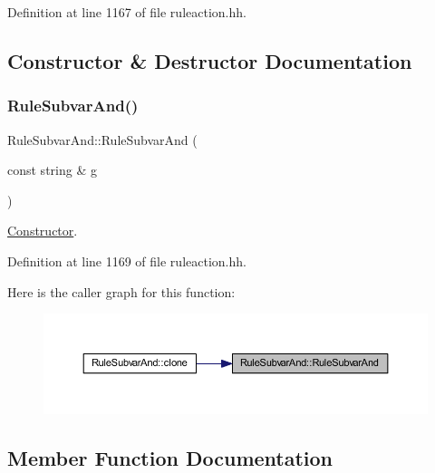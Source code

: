 Definition at line 1167 of file ruleaction.\+hh.



\subsection{Constructor \& Destructor Documentation}
\mbox{\label{class_rule_subvar_and_a3cf5454eb07e66a704d9939883213dc8}} 
\subsubsection{\texorpdfstring{RuleSubvarAnd()}{RuleSubvarAnd()}}
{\footnotesize\ttfamily Rule\+Subvar\+And\+::\+Rule\+Subvar\+And (\begin{DoxyParamCaption}\item[{const string \&}]{g }\end{DoxyParamCaption})\hspace{0.3cm}{\ttfamily [inline]}}



\mbox{\hyperlink{class_constructor}{Constructor}}. 



Definition at line 1169 of file ruleaction.\+hh.

Here is the caller graph for this function\+:
\nopagebreak
\begin{figure}[H]
\begin{center}
\leavevmode
\includegraphics[width=350pt]{class_rule_subvar_and_a3cf5454eb07e66a704d9939883213dc8_icgraph}
\end{center}
\end{figure}


\subsection{Member Function Documentation}
\mbox{\label{class_rule_subvar_and_a8537105bf8b9f97d9d312e84b7f2b39b}} 
